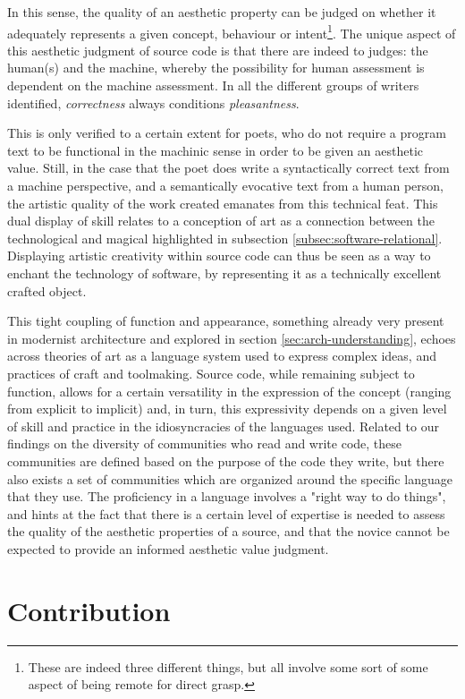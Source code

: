In this sense, the quality of an aesthetic property can be judged on whether it adequately represents a given concept, behaviour or intent\footnote{These are indeed three different things, but all involve some sort of some aspect of being remote for direct grasp.}. The unique aspect of this aesthetic judgment of source code is that there are indeed to judges: the human(s) and the machine, whereby the possibility for human assessment is dependent on the machine assessment. In all the different groups of writers identified, \emph{correctness} always conditions \emph{pleasantness}.

This is only verified to a certain extent for poets, who do not require a program text to be functional in the machinic sense in order to be given an aesthetic value. Still, in the case that the poet does write a syntactically correct text from a machine perspective, and a semantically evocative text from a human person, the artistic quality of the work created emanates from this technical feat. This dual display of skill relates to a conception of art as a connection between the technological and magical highlighted in subsection \ref{subsec:software-relational}. Displaying artistic creativity within source code can thus be seen as a way to enchant the technology of software, by representing it as a technically excellent crafted object.

This tight coupling of function and appearance, something already very present in modernist architecture and explored in section \ref{sec:arch-understanding}, echoes across theories of art as a language system used to express complex ideas, and practices of craft and toolmaking. Source code, while remaining subject to function, allows for a certain versatility in the expression of the concept (ranging from explicit to implicit) and, in turn, this expressivity depends on a given level of skill and practice in the idiosyncracies of the languages used. Related to our findings on the diversity of communities who read and write code, these communities are defined based on the purpose of the code they write, but there also exists a set of communities which are organized around the specific language that they use. The proficiency in a language involves a "right way to do things", and hints at the fact that there is a certain level of expertise is needed to assess the quality of the aesthetic properties of a source, and that the novice cannot be expected to provide an informed aesthetic value judgment.

\section{Contribution}  %
\label{sec:conclusion-contribution}

